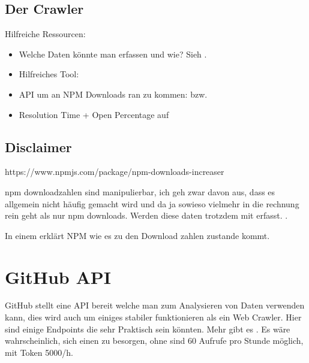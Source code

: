 


\subsection{Der Crawler}

Hilfreiche Ressourcen:

\begin{itemize}
    \item Welche Daten könnte man erfassen und wie? Sieh .
    \item Hilfreiches Tool: 
    \item API um an NPM Downloads ran zu kommen:
          bzw.
    \item Resolution Time + Open Percentage auf 
\end{itemize}



\subsection{Disclaimer}

https://www.npmjs.com/package/npm-downloads-increaser

npm downloadzahlen sind manipulierbar, ich geh zwar davon aus, dass es allgemein nicht häufig gemacht wird
und da ja sowieso vielmehr in die rechnung rein geht als nur npm downloads. Werden diese daten trotzdem mit erfasst.
.

In einem 
erklärt NPM wie es zu den Download zahlen zustande kommt.


\section{GitHub API}
GitHub stellt eine API bereit welche man zum Analysieren von Daten verwenden kann, dies wird auch um
einiges stabiler funktionieren als ein Web Crawler. Hier sind einige Endpoints die sehr Praktisch sein könnten.
Mehr gibt es . Es wäre wahrscheinlich, sich
einen 
zu besorgen, ohne sind 60 Aufrufe pro Stunde möglich, mit Token 5000/h.

